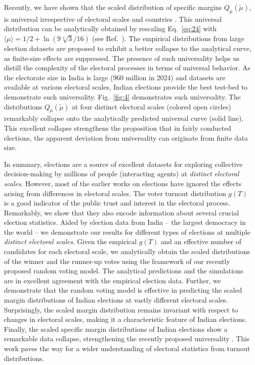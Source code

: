 Recently, we have shown that the scaled distribution of specific margins $Q_{\widetilde{\mu}}(\widetilde{\mu})$, is universal irrespective of electoral scales and countries \cite{pal2024universal}. This universal distribution can be analytically obtained by rescaling Eq.~\ref{eq:24} with $\langle \mu \rangle = {1} / {2}+\ln \left({9 \sqrt[4]{3}} / {16}\right)$ (see Ref.~\cite{supp}). The empirical distributions from large election datasets are proposed to exhibit a better collapse to the analytical curve, as finite-size effects are suppressed. The presence of such universality helps us distill the complexity of the electoral processes in terms of universal behavior. As the electorate size in India is large (960 million in 2024) and datasets are available at various electoral scales, Indian elections provide the best test-bed to demonstrate such universality. Fig.~\ref{fig:4} demonstrates such universality. The distributions $Q_{\widetilde{\mu}}(\widetilde{\mu})$ at four distinct electoral scales (colored open circles) remarkably collapse onto the analytically predicted universal curve (solid line). This excellent collapse strengthens the proposition that in fairly conducted elections, the apparent deviation from universality can originate from finite data size.

In summary, elections are a source of excellent datasets for exploring collective decision-making by millions of people (interacting agents) at {\it distinct electoral scales}. However, most of the earlier works on elections have ignored the effects arising from differences in electoral scales. The voter turnout distribution $g(T)$ is a good indicator of the public trust and interest in the electoral process. Remarkably, we show that they also encode information about several crucial election statistics. Aided by election data from India -- the largest democracy in the world -- we demonstrate our results for different types of elections at multiple {\it distinct electoral scales}. Given the empirical $g(T)$ and an effective number of candidates for each electoral scale, we analytically obtain the scaled distributions of the winner and the runner-up votes using the framework of our recently proposed random voting model. The analytical predictions and the simulations are in excellent agreement with the empirical election data. Further, we demonstrate that the random voting model is effective in predicting the scaled margin distributions of Indian elections at vastly different electoral scales. Surprisingly, the scaled margin distribution remains invariant with respect to changes in electoral scales, making it a characteristic feature of Indian elections. Finally, the scaled specific margin distributions of Indian elections show a remarkable data collapse, strengthening the recently proposed universality \cite{pal2024universal}. This work paves the way for a wider understanding of electoral statistics from turnout distributions.
